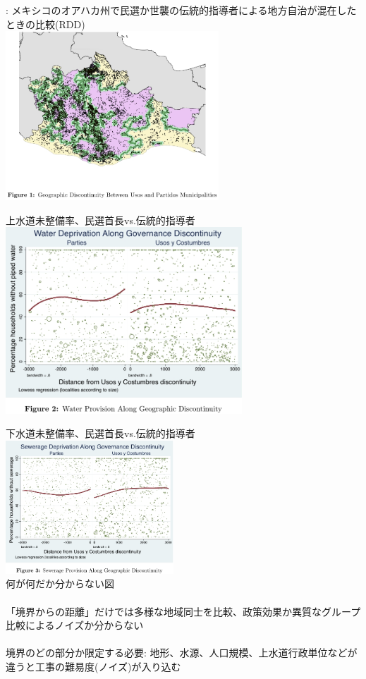 \begin{frame}{}
\citet{Magaloni2019}: メキシコのオアハカ州で民選か世襲の伝統的指導者による地方自治が混在したときの比較(RDD)\\
\pause
\hfil\includegraphics[width = 8cm]{ImpactEvaluation/figure/Magaloni_MexicoUsosFig1.jpg}
\end{frame}

\begin{frame}{}
上水道未整備率、民選首長vs.伝統的指導者\\
\hfil\includegraphics[height = 7cm]{ImpactEvaluation/figure/Magaloni_MexicoUsosFig2.jpg}
\end{frame}

\begin{frame}{}
下水道未整備率、民選首長vs.伝統的指導者\\
\hfil\includegraphics[height = 5cm]{ImpactEvaluation/figure/Magaloni_MexicoUsosFig3.jpg}\\
\pause
何が何だか分からない図\\~\\
\pause
「境界からの距離」だけでは多様な地域同士を比較、政策効果か異質なグループ比較によるノイズか分からない\\~\\
\pause
境界のどの部分か限定する必要: 地形、水源、人口規模、上水道行政単位などが違うと工事の難易度(ノイズ)が入り込む
\end{frame}


